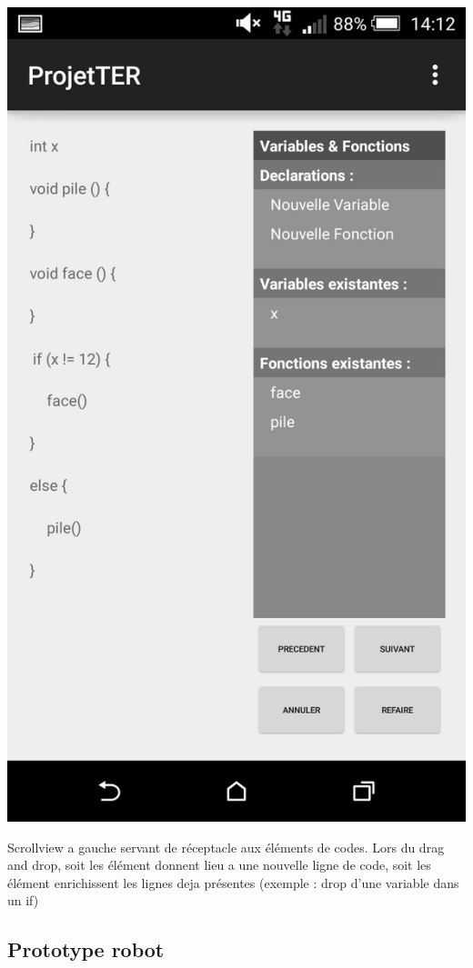 \documentclass[a4paper]{article}
\begin{document}
\begin{center}
\includegraphics[scale=0.1]{img/create3.jpg}
\end{center}

Scrollview a gauche servant de réceptacle aux éléments de codes. Lors du drag and drop, soit les élément donnent lieu a une nouvelle ligne de code, soit les élément enrichissent les lignes deja présentes (exemple : drop d’une variable dans un if)

\subsection{Prototype robot}
\end{document}
